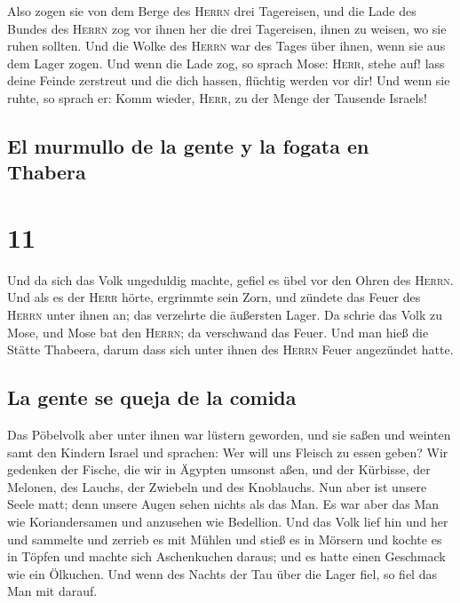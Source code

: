  Also zogen sie von dem Berge des \textsc{Herrn} drei
Tagereisen, und die Lade des Bundes des \textsc{Herrn} zog vor ihnen her
die drei Tagereisen, ihnen zu weisen, wo sie ruhen sollten.
 Und die Wolke des \textsc{Herrn} war des Tages über
ihnen, wenn sie aus dem Lager zogen.  Und wenn die Lade
zog, so sprach Mose: \textsc{Herr}, stehe auf! lass deine Feinde
zerstreut und die dich hassen, flüchtig werden vor dir! 
Und wenn sie ruhte, so sprach er: Komm wieder, \textsc{Herr}, zu der
Menge der Tausende Israels!

\hypertarget{el-murmullo-de-la-gente-y-la-fogata-en-thabera}{%
\subsection{El murmullo de la gente y la fogata en
Thabera}\label{el-murmullo-de-la-gente-y-la-fogata-en-thabera}}

\hypertarget{section-10}{%
\section{11}\label{section-10}}

 Und da sich das Volk ungeduldig machte, gefiel es übel
vor den Ohren des \textsc{Herrn}. Und als es der \textsc{Herr} hörte,
ergrimmte sein Zorn, und zündete das Feuer des \textsc{Herrn} unter
ihnen an; das verzehrte die äußersten Lager.  Da schrie
das Volk zu Mose, und Mose bat den \textsc{Herrn}; da verschwand das
Feuer.  Und man hieß die Stätte Thabeera, darum dass sich
unter ihnen des \textsc{Herrn} Feuer angezündet hatte.

\hypertarget{la-gente-se-queja-de-la-comida}{%
\subsection{La gente se queja de la
comida}\label{la-gente-se-queja-de-la-comida}}

 Das Pöbelvolk aber unter ihnen war lüstern geworden, und
sie saßen und weinten samt den Kindern Israel und sprachen: Wer will uns
Fleisch zu essen geben?  Wir gedenken der Fische, die wir
in Ägypten umsonst aßen, und der Kürbisse, der Melonen, des Lauchs, der
Zwiebeln und des Knoblauchs.  Nun aber ist unsere Seele
matt; denn unsere Augen sehen nichts als das Man.  Es war
aber das Man wie Koriandersamen und anzusehen wie Bedellion.
 Und das Volk lief hin und her und sammelte und zerrieb es
mit Mühlen und stieß es in Mörsern und kochte es in Töpfen und machte
sich Aschenkuchen daraus; und es hatte einen Geschmack wie ein Ölkuchen.
 Und wenn des Nachts der Tau über die Lager fiel, so fiel
das Man mit darauf.

